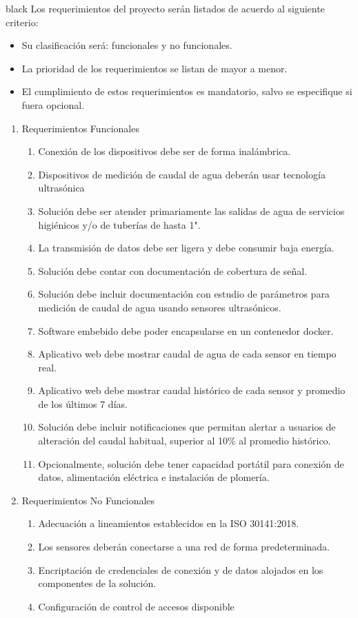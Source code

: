 \documentclass[
11pt, %
codirector, %
]{charter}
\begin{document}
\begin{consigna}{black}
Los requerimientos del proyecto serán listados de acuerdo al siguiente criterio:
\begin{itemize}
	\item Su clasificación será: funcionales y no funcionales.
	\item La prioridad de los requerimientos se listan de mayor a menor.
	\item El cumplimiento de estos requerimientos es mandatorio, salvo se especifique si fuera opcional.
\end{itemize}

\begin{enumerate}
\item Requerimientos Funcionales

	\begin{enumerate}
		\item Conexión de los dispositivos debe ser de forma inalámbrica.
		\item Dispositivos de medición de caudal de agua deberán usar tecnología ultrasónica
		\item Solución debe ser atender primariamente las salidas de agua de servicios higiénicos y/o de tuberías de hasta 1".
		\item La transmisión de datos debe ser ligera y debe consumir baja energía. 
		\item Solución debe contar con documentación de cobertura de señal. 
		\item Solución debe incluir documentación con estudio de parámetros para medición de caudal de agua usando sensores ultrasónicos.
		\item Software embebido debe poder encapsularse en un contenedor docker.
		\item Aplicativo web debe mostrar caudal de agua de cada sensor en tiempo real. 
		\item Aplicativo web debe mostrar caudal histórico de cada sensor y promedio de los últimos 7 días.
		\item Solución debe incluir notificaciones que permitan alertar a usuarios de alteración del caudal habitual, superior al 10\% al promedio histórico.		
		\item Opcionalmente, solución debe tener capacidad portátil para conexión de datos, alimentación eléctrica e instalación de plomería.
	\end{enumerate}

\item Requerimientos No Funcionales
	\begin{enumerate}
		\item Adecuación a lineamientos establecidos en la ISO 30141:2018.
		\item Los sensores deberán conectarse a una red de forma predeterminada.
		\item Encriptación de credenciales de conexión y de datos alojados en los componentes de la solución.
		\item Configuración de control de accesos disponible
	\end{enumerate}


\end{enumerate}
\end{consigna}
\end{document}

